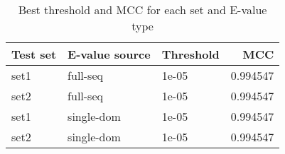 \documentclass{article}
\begin{document}
\begin{table}[htbp]
\centering
\caption{Best threshold and MCC for each set and E-value type}
\label{tab:best_thresholds}
\begin{tabular}{lllr}
\toprule
Test set & E-value source & Threshold & MCC \\
\midrule
set1 & full-seq & 1e-05 & 0.994547 \\
set2 & full-seq & 1e-05 & 0.994547 \\
set1 & single-dom & 1e-05 & 0.994547 \\
set2 & single-dom & 1e-05 & 0.994547 \\
\bottomrule
\end{tabular}
\end{table}
\end{document}
